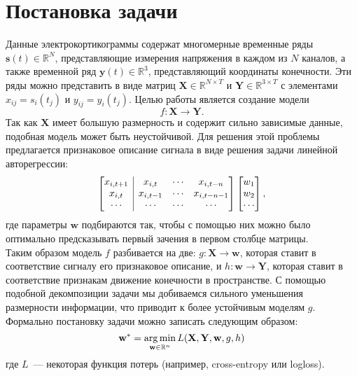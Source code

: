 \documentclass[12pt,twoside]{article}
\begin{document}
\section{Постановка задачи}
Данные электрокортикограммы содержат многомерные временные ряды $\mathbf{s}(t) \in \mathbb{R}^{N}$, представляющие измерения напряжения в каждом из $N$ каналов, а также временной ряд $\mathbf{y}(t) \in \mathbb{R}^3$, представляющий координаты конечности. Эти ряды можно представить в виде матриц $\mathbf{X} \in \mathbb{R}^{N \times T}$ и $\mathbf{Y} \in \mathbb{R}^{3 \times T}$ с элементами $x_{ij} = s_i(t_j)$ и $y_{ij} = y_i(t_j)$. Целью работы является создание модели
\[
    f: \mathbf{X} \to \mathbf{Y}.
\]
Так как $\mathbf{X}$ имеет большую размерность и содержит сильно зависимые данные, подобная модель может быть неустойчивой. Для решения этой проблемы предлагается признаковое описание сигнала в виде решения задачи линейной авторегрессии:
\[
    \left[\begin{array}{@{}c|ccc@{}}
        x_{i, t+1} & x_{i, t}   & \cdots & x_{i, t-n}   \\
        x_{i, t}   & x_{i, t-1} & \cdots & x_{i, t-n-1} \\
        \cdots     & \cdots     & \cdots & \cdots
    \end{array}\right]
    \begin{bmatrix}
        w_1 \\
        w_2 \\
        \cdots
    \end{bmatrix},
\]
где параметры $\mathbf{w}$ подбираются так, чтобы с помощью них можно было оптимально предсказывать первый зачения в первом столбце матрицы.\\
Таким образом модель $f$ разбивается на две: $g: \mathbf{X} \to \mathbf{w}$, которая ставит в соответствие сигналу его признаковое описание, и $h: \mathbf{w} \to \mathbf{Y}$, которая ставит в соответствие признакам движение конечности в пространстве. С помощью подобной декомпозиции задачи мы добиваемся сильного уменьшения размерности информации, что приводит к более устойчивым моделям $g$.\\
Формально постановку задачи можно записать следующим образом:
\[
    \mathbf{w}^* = \argmin_{\mathbf{w} \in \mathbb{R}^n} L(\mathbf{X}, \mathbf{Y}, \mathbf{w}, g, h)
\]
где $L$~--- некоторая функция потерь (например, cross-entropy или logloss).





\end{document}
